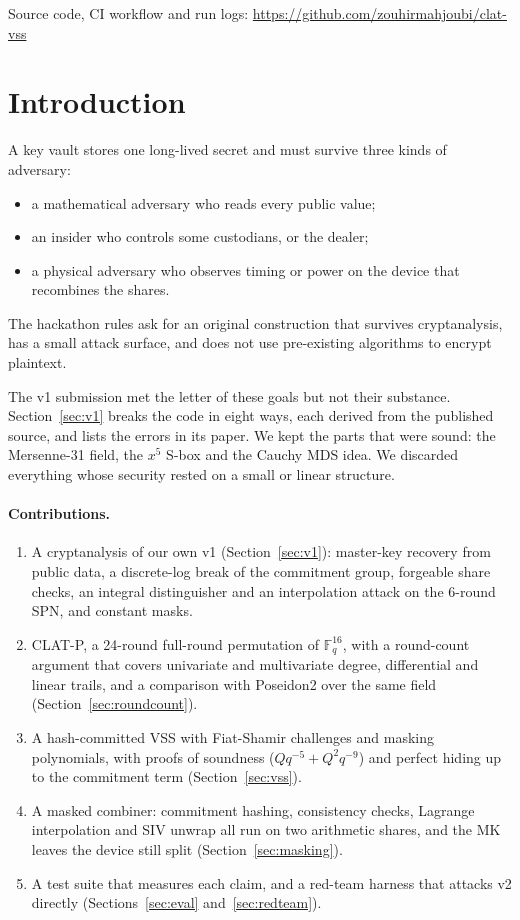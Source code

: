 \documentclass[10pt,a4paper]{article}
\newcommand{\Fq}{\mathbb{F}_q}
\theoremstyle{definition}
\theoremstyle{remark}
\begin{document}
\begin{center}\small
Source code, CI workflow and run logs: \url{https://github.com/zouhirmahjoubi/clat-vss}
\end{center}

\section{Introduction}

A key vault stores one long-lived secret and must survive three kinds of adversary:
\begin{itemize}
  \item a mathematical adversary who reads every public value;
  \item an insider who controls some custodians, or the dealer;
  \item a physical adversary who observes timing or power on the device that recombines the shares.
\end{itemize}
The hackathon rules ask for an original construction that survives cryptanalysis, has a small attack surface, and does not use pre-existing algorithms to encrypt plaintext.

The v1 submission met the letter of these goals but not their substance. Section~\ref{sec:v1} breaks the code in eight ways, each derived from the published source, and lists the errors in its paper. We kept the parts that were sound: the Mersenne-31 field, the $x^5$ S-box and the Cauchy MDS idea. We discarded everything whose security rested on a small or linear structure.

\paragraph{Contributions.}
\begin{enumerate}
  \item A cryptanalysis of our own v1 (Section~\ref{sec:v1}): master-key recovery from public data, a discrete-log break of the commitment group, forgeable share checks, an integral distinguisher and an interpolation attack on the 6-round SPN, and constant masks.
  \item CLAT-P, a 24-round full-round permutation of $\Fq^{16}$, with a round-count argument that covers univariate and multivariate degree, differential and linear trails, and a comparison with Poseidon2 over the same field (Section~\ref{sec:roundcount}).
  \item A hash-committed VSS with Fiat-Shamir challenges and masking polynomials, with proofs of soundness ($Q q^{-5} + Q^2 q^{-9}$) and perfect hiding up to the commitment term (Section~\ref{sec:vss}).
  \item A masked combiner: commitment hashing, consistency checks, Lagrange interpolation and SIV unwrap all run on two arithmetic shares, and the MK leaves the device still split (Section~\ref{sec:masking}).
  \item A test suite that measures each claim, and a red-team harness that attacks v2 directly (Sections~\ref{sec:eval} and~\ref{sec:redteam}).
\end{enumerate}
\end{document}
